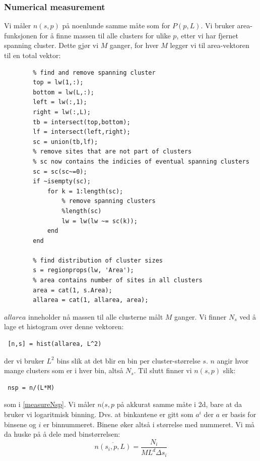 \documentclass[english, a4paper]{article}
\begin{document}
\subsubsection{Numerical measurement}
Vi måler $n(s,p)$ på noenlunde samme måte som for $P(p,L)$. Vi bruker area-funksjonen for å 
finne massen til alle clusters for ulike $p$, etter vi har fjernet spanning cluster. Dette gjør vi 
$M$ ganger, for hver $M$ legger vi til area-vektoren til en total vektor:
\begin{lstlisting}
        % find and remove spanning cluster
        top = lw(1,:);
        bottom = lw(L,:);
        left = lw(:,1);
        right = lw(:,L);
        tb = intersect(top,bottom);
        lf = intersect(left,right);
        sc = union(tb,lf);
        % remove sites that are not part of clusters
        % sc now contains the indicies of eventual spanning clusters
        sc = sc(sc~=0);
        if ~isempty(sc);
            for k = 1:length(sc);
                % remove spanning clusters
                %length(sc)
                lw = lw(lw ~= sc(k));
            end
        end
        
        % find distribution of cluster sizes
        s = regionprops(lw, 'Area');
        % area contains number of sites in all clusters
        area = cat(1, s.Area);
        allarea = cat(1, allarea, area);
\end{lstlisting}
$allarea$ inneholder nå massen til alle clusterne målt $M$ ganger. Vi finner $N_s$ ved
å lage et histogram over denne vektoren:
\begin{lstlisting}
 [n,s] = hist(allarea, L^2)
\end{lstlisting}
der vi bruker $L^2$ bins slik at det blir en bin per cluster-størrelse $s$. $n$ angir hvor mange clusters
som er i hver bin, altså $N_s$. Til slutt finner vi $n(s,p)$ slik:
\begin{lstlisting}
 nsp = n/(L*M)
\end{lstlisting}
som i \eqref{measureNsp}. Vi måler $n(s,p$ på akkurat samme måte i 2d, bare at da bruker vi 
logaritmisk binning. Dvs. at binkantene er gitt som $a^i$ der $a$ er basis for binsene og
$i$ er binnummeret. Binene øker altså i størrelse med nummeret. Vi må da huske på å dele med 
binstørrelsen:
\begin{equation}
 \overline{n(s_i,p,L)} = \frac{N_i}{ML^d\Delta s_i}
\end{equation}
\end{document}
